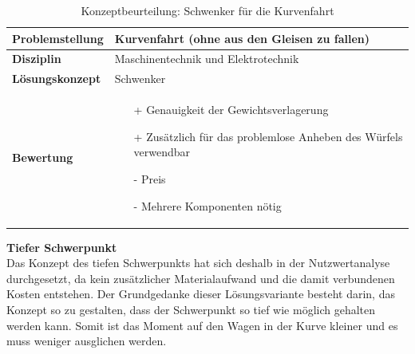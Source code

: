 \documentclass[../../main.tex]{subfiles}
\begin{document}

    \begin{flushleft}
        \begin{table}[h]
        \begin{tabular}{ | l | p{11cm} |}
        \hline
        \textbf{Problemstellung} & Kurvenfahrt (ohne aus den Gleisen zu fallen) \\ \hline
        \textbf{Disziplin} & Maschinentechnik und Elektrotechnik \\ \hline
        \textbf{Lösungskonzept} & Schwenker \\ \hline
        \textbf{Bewertung} &  \begin{itemize}
                                \item[+] Genauigkeit der Gewichtsverlagerung
                                \item[+] Zusätzlich für das problemlose Anheben des Würfels verwendbar
                                \item[-] Preis 
                                \item[-] Mehrere Komponenten nötig 
                              \end{itemize} \\ \hline
        \end{tabular}
        \caption{Konzeptbeurteilung: Schwenker für die Kurvenfahrt}
        \label{tab:schwenker}
    \end{table}
    \end{flushleft}

    \textbf{Tiefer Schwerpunkt}\\
    Das Konzept des tiefen Schwerpunkts hat sich deshalb in der Nutzwertanalyse durchgesetzt, da kein zusätzlicher Materialaufwand und die damit verbundenen Kosten entstehen. Der Grundgedanke dieser Lösungsvariante besteht darin, das Konzept so zu gestalten, dass der Schwerpunkt so tief wie möglich gehalten werden kann. Somit ist das Moment auf den Wagen in der Kurve kleiner und es muss weniger ausglichen werden.

\end{document}
